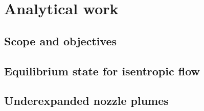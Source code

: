 \section{Analytical work}

\subsection{Scope and objectives}

\newpage

\subsection{Equilibrium state for isentropic flow}

\newpage

\subsection{Underexpanded nozzle plumes}

\newpage
